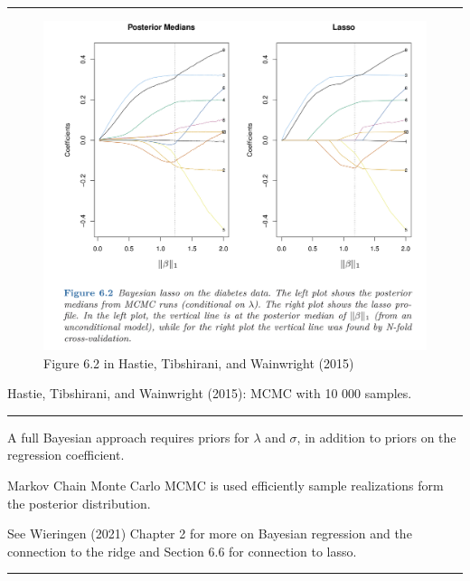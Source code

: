 \documentclass[
  letterpaper,
  DIV=11,
  numbers=noendperiod]{scrartcl}
\begin{document}
\begin{center}\rule{0.5\linewidth}{0.5pt}\end{center}

\begin{figure}

{\centering \includegraphics[width=1\textwidth,height=\textheight]{./HTWFig62.jpg}

}

\caption{Figure 6.2 in Hastie, Tibshirani, and Wainwright (2015)}

\end{figure}

Hastie, Tibshirani, and Wainwright (2015): MCMC with 10 000 samples.

\begin{center}\rule{0.5\linewidth}{0.5pt}\end{center}

A full Bayesian approach requires priors for \(\lambda\) and \(\sigma\),
in addition to priors on the regression coefficient.

Markov Chain Monte Carlo MCMC is used efficiently sample realizations
form the posterior distribution.

See Wieringen (2021) Chapter 2 for more on Bayesian regression and the
connection to the ridge and Section 6.6 for connection to lasso.

\begin{center}\rule{0.5\linewidth}{0.5pt}\end{center}
\end{document}
